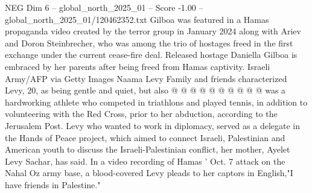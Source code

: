 \begin{textsample}{NEG Dim 6 – global\_north\_2025\_01 – Score -1.00 – global\_north\_2025\_01/120462352.txt}
Gilboa was featured in a Hamas propaganda video created by the terror group in January 2024 along with Ariev and Doron Steinbrecher, who was among the trio of hostages freed in the first exchange under the current cease-fire deal.
Released hostage Daniella Gilboa is embraced by her parents after being freed from Hamas captivity.
Israeli Army/AFP via Getty Images Naama Levy Family and friends characterized Levy, 20, as being gentle and quiet, but also @ @ @ @ @ @ @ @ @ @ was a hardworking athlete who competed in triathlons and played tennis, in addition to volunteering with the Red Cross, prior to her abduction, according to the Jerusalem Post.
Levy who wanted to work in diplomacy, served as a delegate in the Hands of Peace project, which aimed to connect Israeli, Palestinian and American youth to discuss the Israeli-Palestinian conflict, her mother, Ayelet Levy Sachar, has said.
In a video recording of Hamas ' Oct. 7 attack on the Nahal Oz army base, a blood-covered Levy pleads to her captors in English,"I have friends in Palestine."

\end{textsample}
